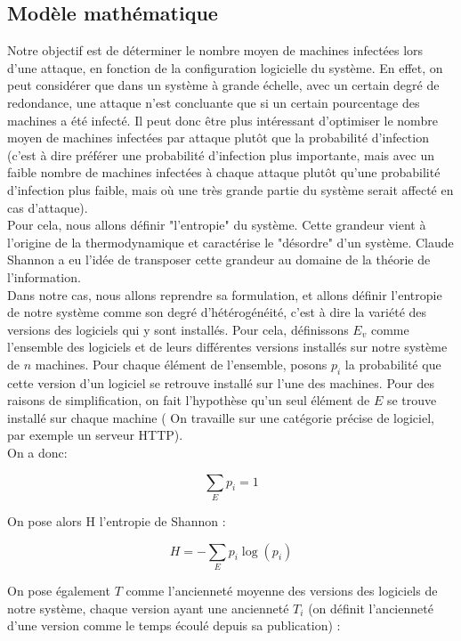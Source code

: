\subsection{Modèle mathématique}\label{sec:modelMath}

Notre objectif est de déterminer le nombre moyen de machines infectées lors d'une attaque, en fonction de la configuration logicielle du système. En effet, on peut considérer que dans un système à grande échelle, avec un certain degré de redondance, une attaque n'est concluante que si un certain pourcentage des machines a été infecté. Il peut donc être plus intéressant d'optimiser le nombre moyen de machines infectées par attaque plutôt que la probabilité d'infection (c'est à dire préférer une probabilité d'infection plus importante, mais avec un faible nombre de machines infectées à chaque attaque plutôt qu'une probabilité d'infection plus faible, mais où une très grande partie du système serait affecté en cas d'attaque).\\
Pour cela, nous allons définir "l'entropie" du système. Cette grandeur vient à l'origine de la thermodynamique et caractérise le "désordre" d'un système. Claude Shannon a eu l'idée de transposer cette grandeur au domaine de la théorie de l'information\cite{entropie_shannon}.\\
Dans notre cas, nous allons reprendre sa formulation, et allons définir l'entropie de notre système comme son degré d'hétérogénéité, c'est à dire la variété des versions des logiciels qui y sont installés.
Pour cela, définissons $E_v$ comme l'ensemble des logiciels et de leurs différentes versions installés sur notre système de $n$ machines. Pour chaque élément de l'ensemble, posons $p_i$ la probabilité que cette version d'un logiciel se retrouve installé sur l'une des machines. Pour des raisons de simplification, on fait l'hypothèse qu'un seul élément de $E$ se trouve installé sur chaque machine ( On travaille sur une catégorie précise de logiciel, par exemple un serveur HTTP).\\
On a donc:

\[
\sum_{E}p_i=1
\]

On pose alors H l'entropie de Shannon :

\[
H=-\sum_E p_i \log(p_i)
\]

On pose également $T$ comme l'ancienneté moyenne des versions des logiciels de notre système, chaque version ayant une ancienneté $T_i$ (on définit l'ancienneté d'une version comme le temps écoulé depuis sa publication)  :

